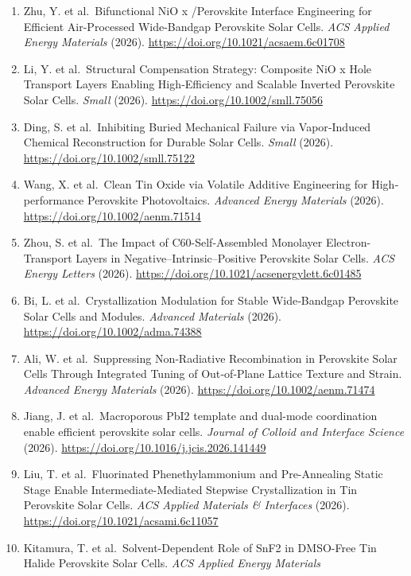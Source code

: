\documentclass[
  11pt,
]{article}
\begin{document}
\begin{enumerate}
  \url{https://doi.org/10.1021/acsami.6c07884}
\item
  Zhu, Y. et al.~Bifunctional NiO x /Perovskite Interface Engineering
  for Efficient Air-Processed Wide-Bandgap Perovskite Solar Cells.
  \emph{ACS Applied Energy Materials} (2026).
  \url{https://doi.org/10.1021/acsaem.6c01708}
\item
  Li, Y. et al.~Structural Compensation Strategy: Composite NiO x Hole
  Transport Layers Enabling High‐Efficiency and Scalable Inverted
  Perovskite Solar Cells. \emph{Small} (2026).
  \url{https://doi.org/10.1002/smll.75056}
\item
  Ding, S. et al.~Inhibiting Buried Mechanical Failure via Vapor‐Induced
  Chemical Reconstruction for Durable Solar Cells. \emph{Small} (2026).
  \url{https://doi.org/10.1002/smll.75122}
\item
  Wang, X. et al.~Clean Tin Oxide via Volatile Additive Engineering for
  High‐performance Perovskite Photovoltaics. \emph{Advanced Energy
  Materials} (2026). \url{https://doi.org/10.1002/aenm.71514}
\item
  Zhou, S. et al.~The Impact of C60-Self-Assembled Monolayer
  Electron-Transport Layers in Negative--Intrinsic--Positive Perovskite
  Solar Cells. \emph{ACS Energy Letters} (2026).
  \url{https://doi.org/10.1021/acsenergylett.6c01485}
\item
  Bi, L. et al.~Crystallization Modulation for Stable Wide‐Bandgap
  Perovskite Solar Cells and Modules. \emph{Advanced Materials} (2026).
  \url{https://doi.org/10.1002/adma.74388}
\item
  Ali, W. et al.~Suppressing Non‐Radiative Recombination in Perovskite
  Solar Cells Through Integrated Tuning of Out‐of‐Plane Lattice Texture
  and Strain. \emph{Advanced Energy Materials} (2026).
  \url{https://doi.org/10.1002/aenm.71474}
\item
  Jiang, J. et al.~Macroporous PbI2 template and dual-mode coordination
  enable efficient perovskite solar cells. \emph{Journal of Colloid and
  Interface Science} (2026).
  \url{https://doi.org/10.1016/j.jcis.2026.141449}
\item
  Liu, T. et al.~Fluorinated Phenethylammonium and Pre-Annealing Static
  Stage Enable Intermediate-Mediated Stepwise Crystallization in Tin
  Perovskite Solar Cells. \emph{ACS Applied Materials \& Interfaces}
  (2026). \url{https://doi.org/10.1021/acsami.6c11057}
\item
  Kitamura, T. et al.~Solvent-Dependent Role of SnF2 in DMSO-Free Tin
  Halide Perovskite Solar Cells. \emph{ACS Applied Energy Materials}

\end{enumerate}
\end{document}
